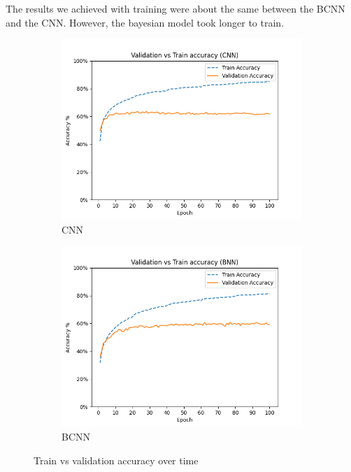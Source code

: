 \documentclass[12pt]{article}
\begin{document}
The results we achieved with training were about the same between the BCNN and the CNN. However, the bayesian model took longer to train.

\begin{figure}[H]
	\centering
	\begin{subfigure}{.5\textwidth}
		\centering
		\includegraphics[width=\linewidth]{../Images/CNN_val_acc_over_time}
		\caption{CNN}
	\end{subfigure}%
	\begin{subfigure}{.5\textwidth}
		\centering
		\includegraphics[width=\linewidth]{../Images/BNN_val_acc_over_time}
		\caption{BCNN}
	\end{subfigure}
	\caption{Train vs validation accuracy over time}
	\label{fig:train-v-val}
\end{figure}
\end{document}
